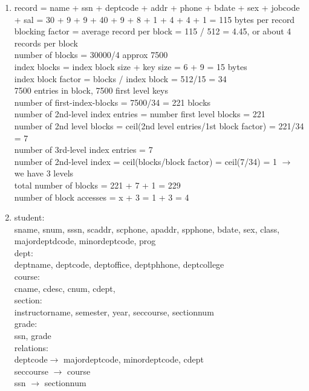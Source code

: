 \documentclass[12pt]{article}
\begin{document}
\begin{enumerate}
	\item record = name + ssn + deptcode + addr + phone + bdate + sex + jobcode + sal = 30 + 9 + 9 + 40 + 9 + 8 + 1 + 4 + 4 + 1 = 115 bytes per record\\
blocking factor = average record per block = 115 / 512 = 4.45, or about 4 records per block\\
number of blocks = 30000/4 approx 7500\\
index blocks = index block size + key size = 6 + 9 = 15 bytes\\
index block factor = blocks / index block = 512/15 = 34\\
7500 entries in block, 7500 first level keys\\
number of first-index-blocks = 7500/34 = 221 blocks\\
number of 2nd-level index entries = number first level blocks = 221\\
number of 2nd level blocks = ceil(2nd level entries/1st block factor) = 221/34 = 7\\
number of 3rd-level index entries = 7\\
number of 2nd-level index = ceil(blocks/block factor) = ceil(7/34) = 1 $\rightarrow$ we have 3 levels\\
total number of blocks = 221 + 7 + 1 = 229\\
number of block accesses = x + 3 = 1 + 3 = 4\\

	\item student:\\
sname, snum, sssn, scaddr, scphone, apaddr, spphone, bdate, sex, class, majordeptdcode, minordeptcode, prog\\

dept:\\
deptname, deptcode, deptoffice, deptphhone, deptcollege\\

course:\\
cname, cdesc, cnum, cdept,\\

section:\\
instructorname, semester, year, seccourse, sectionnum\\

grade:\\
ssn, grade\\

relations:\\
deptcode$\rightarrow$ majordeptcode, minordeptcode, cdept\\
seccourse $\rightarrow$ course\\
ssn $\rightarrow$ sectionnum\\


\end{enumerate}
\end{document}
